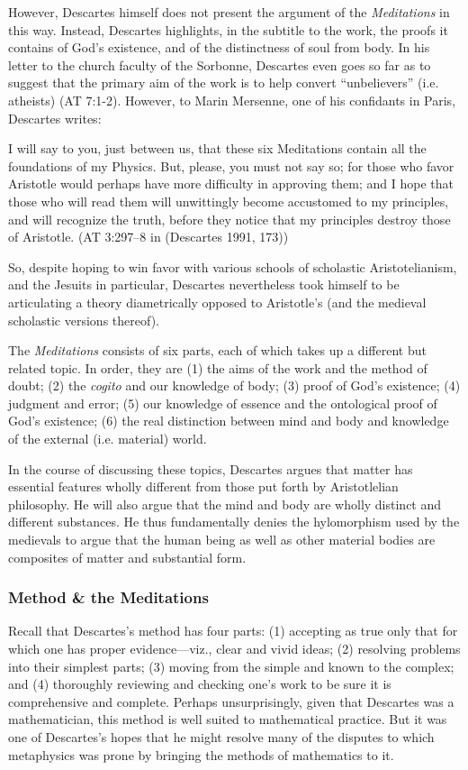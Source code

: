\documentclass[12pt]{article}
\makeatletter
\newcommand{\citeprocitem}[2]{\hyper@linkstart{cite}{citeproc_bib_item_#1}#2\hyper@linkend}
\makeatother
\begin{document}
However, Descartes himself does not present the argument of the \emph{Meditations} in this
way. Instead, Descartes highlights, in the subtitle to the work, the proofs it
contains of God's existence, and of the distinctness of soul from body. In his letter
to the church faculty of the Sorbonne, Descartes even goes so far as to suggest that
the primary aim of the work is to help convert ``unbelievers'' (i.e. atheists) (AT
7:1-2). However, to Marin Mersenne, one of his confidants in Paris, Descartes writes:

\begin{quote-b}
I will say to you, just between us, that these six Meditations contain all the
foundations of my Physics. But, please, you must not say so; for those who favor
Aristotle would perhaps have more difficulty in approving them; and I hope that
those who will read them will unwittingly become accustomed to my principles, and
will recognize the truth, before they notice that my principles destroy those of
Aristotle. (AT 3:297--8 in (\citeprocitem{3}{Descartes 1991, 173}))
\end{quote-b}

So, despite hoping to win favor with various schools of scholastic Aristotelianism,
and the Jesuits in particular, Descartes nevertheless took himself to be articulating a
theory diametrically opposed to Aristotle's (and the medieval scholastic versions
thereof).

The \emph{Meditations} consists of six parts, each of which takes up a different but related
topic. In order, they are (1) the aims of the work and the method of doubt; (2) the
\emph{cogito} and our knowledge of body; (3) proof of God's existence; (4) judgment and
error; (5) our knowledge of essence and the ontological proof of God's existence; (6)
the real distinction between mind and body and knowledge of the external (i.e.
material) world.

In the course of discussing these topics, Descartes argues that matter has essential
features wholly different from those put forth by Aristotlelian philosophy. He will
also argue that the mind and body are wholly distinct and different substances. He
thus fundamentally denies the hylomorphism used by the medievals to argue that the
human being as well as other material bodies are composites of matter and substantial
form.

\subsubsection{Method \& the Meditations}
\label{sec:orgcdd60f0}
Recall that Descartes's method has four parts: (1) accepting as true only that for
which one has proper evidence---viz., clear and vivid ideas; (2) resolving problems
into their simplest parts; (3) moving from the simple and known to the complex; and
(4) thoroughly reviewing and checking one's work to be sure it is comprehensive and
complete. Perhaps unsurprisingly, given that Descartes was a mathematician, this
method is well suited to mathematical practice. But it was one of Descartes's hopes
that he might resolve many of the disputes to which metaphysics was prone by bringing
the methods of mathematics to it.
\end{document}
